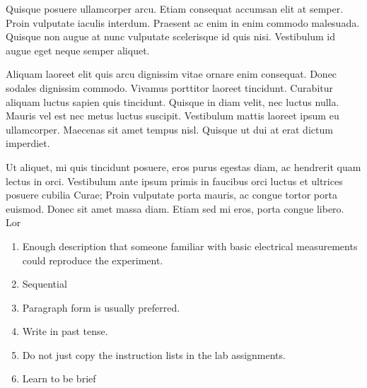 \documentclass{article}
\begin{document}
Quisque posuere ullamcorper arcu. Etiam consequat accumsan elit at
semper. Proin vulputate iaculis interdum. Praesent ac enim in enim commodo
malesuada. Quisque non augue at nunc vulputate scelerisque id quis nisi.
Vestibulum id augue eget neque semper aliquet.

Aliquam laoreet elit quis arcu dignissim vitae ornare enim consequat. Donec
sodales dignissim commodo. Vivamus porttitor laoreet tincidunt. Curabitur
aliquam luctus sapien quis tincidunt. Quisque in diam velit, nec luctus nulla.
Mauris vel est nec metus luctus suscipit. Vestibulum mattis laoreet ipsum eu
ullamcorper. Maecenas sit amet tempus nisl. Quisque ut dui at erat dictum
imperdiet. 

Ut aliquet, mi quis tincidunt posuere, eros purus egestas diam, ac
hendrerit quam lectus in orci. Vestibulum ante ipsum primis in faucibus orci
luctus et ultrices posuere cubilia Curae; Proin vulputate porta mauris, ac
congue tortor porta euismod. Donec sit amet massa diam. Etiam sed mi eros,
porta congue libero. Lor

\begin{enumerate}{}{}
\item Enough description that someone familiar with basic electrical
  measurements could reproduce the experiment.
\item Sequential
\item Paragraph form is usually preferred.
\item Write in past tense.
\item Do not just copy the instruction lists in the lab assignments.
\item Learn to be brief
\end{enumerate}
\end{document}
